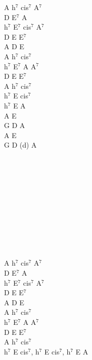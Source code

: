 \documentclass[a5paper, 10pt]{book}
\begin{document}
\begin{minipage}[t]{0.35\textwidth}
A h$^7$ cis$^7$ A$^7$\\
D E$^7$ A\\
h$^7$ E$^7$ cis$^7$ A$^7$\\
D E E$^7$\\
A D E\\
A h$^7$ cis$^7$\\
h$^7$ E$^7$ A A$^7$\\
D E E$^7$\\
A h$^7$ cis$^7$\\
h$^7$ E cis$^7$ \\
h$^7$ E A\\

A E \\
G D A\\
A E \\
G D (d) A\\

~\\
~\\
~\\
~\\
~\\
~\\
~\\
~\\
~\\
~\\
~\\

A h$^7$ cis$^7$ A$^7$\\
D E$^7$ A\\
h$^7$ E$^7$ cis$^7$ A$^7$\\
D E E$^7$\\
A D E\\
A h$^7$ cis$^7$\\
h$^7$ E$^7$ A A$^7$\\
D E E$^7$\\
A h$^7$ cis$^7$\\
h$^7$ E cis$^7$, h$^7$ E cis$^7$, h$^7$ E A\\
\end{minipage}

\newpage
\end{document}
